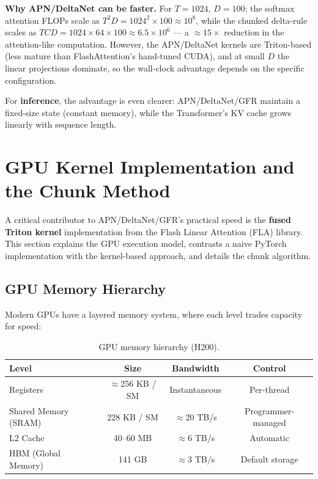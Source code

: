 \documentclass[11pt,a4paper]{article}
\begin{document}
\textbf{Why APN/DeltaNet can be faster.}
For $T=1024$, $D=100$: the softmax attention FLOPs scale as $T^2 D = 1024^2 \times 100 \approx 10^8$, while the chunked delta-rule scales as $TCD = 1024 \times 64 \times 100 \approx 6.5 \times 10^6$ --- a $\approx 15\times$ reduction in the attention-like computation.
However, the APN/DeltaNet kernels are Triton-based (less mature than FlashAttention's hand-tuned CUDA), and at small $D$ the linear projections dominate, so the wall-clock advantage depends on the specific configuration.

For \textbf{inference}, the advantage is even clearer: APN/DeltaNet/GFR maintain a fixed-size state (constant memory), while the Transformer's KV cache grows linearly with sequence length.

\section{GPU Kernel Implementation and the Chunk Method}
\label{sec:kernels}

A critical contributor to APN/DeltaNet/GFR's practical speed is the \textbf{fused Triton kernel} implementation from the Flash Linear Attention (FLA) library.
This section explains the GPU execution model, contrasts a naive PyTorch implementation with the kernel-based approach, and details the chunk algorithm.

\subsection{GPU Memory Hierarchy}

Modern GPUs have a layered memory system, where each level trades capacity for speed:

\begin{table}[h]
\centering
\caption{GPU memory hierarchy (H200).}
\label{tab:memhierarchy}
\begin{tabular}{lccc}
\toprule
\textbf{Level} & \textbf{Size} & \textbf{Bandwidth} & \textbf{Control} \\
\midrule
Registers & $\approx$256 KB / SM & Instantaneous & Per-thread \\
Shared Memory (SRAM) & 228 KB / SM & $\approx$20 TB/s & Programmer-managed \\
L2 Cache & 40--60 MB & $\approx$6 TB/s & Automatic \\
HBM (Global Memory) & 141 GB & $\approx$3 TB/s & Default storage \\
\bottomrule
\end{tabular}
\end{table}
\end{document}
